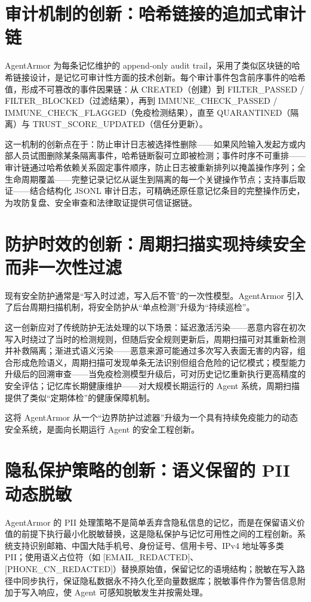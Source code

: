 \documentclass[UTF8,zihao=-4,oneside,fontset=none]{ctexrep}
\begin{document}
	\section{审计机制的创新：哈希链接的追加式审计链}
	AgentArmor 为每条记忆维护的 append-only audit trail，采用了类似区块链的哈希链接设计，是记忆可审计性方面的技术创新。每个审计事件包含前序事件的哈希值，形成不可篡改的事件因果链：从 CREATED（创建）到 FILTER\_PASSED / FILTER\_BLOCKED（过滤结果），再到 IMMUNE\_CHECK\_PASSED / IMMUNE\_CHECK\_FLAGGED（免疫检测结果），直至 QUARANTINED（隔离）与 TRUST\_SCORE\_UPDATED（信任分更新）。
	
	这一机制的创新点在于：防止审计日志被选择性删除——如果风险输入发起方或内部人员试图删除某条隔离事件，哈希链断裂可立即被检测；事件时序不可重排——审计链通过哈希依赖关系固定事件顺序，防止日志被重新排列以掩盖操作序列；全生命周期覆盖——完整记录记忆从诞生到隔离的每一个关键操作节点；支持事后取证——结合结构化 JSONL 审计日志，可精确还原任意记忆条目的完整操作历史，为攻防复盘、安全审查和法律取证提供可信证据链。
	
	\section{防护时效的创新：周期扫描实现持续安全而非一次性过滤}
	现有安全防护通常是“写入时过滤，写入后不管”的一次性模型。AgentArmor 引入了后台周期扫描机制，将安全防护从“单点检测”升级为“持续巡检”。
	
	这一创新应对了传统防护无法处理的以下场景：延迟激活污染——恶意内容在初次写入时绕过了当时的检测规则，但随后安全规则更新后，周期扫描可对其重新检测并补救隔离；渐进式语义污染——恶意来源可能通过多次写入表面无害的内容，组合形成危险语义，周期扫描可发现单条无法识别但组合危险的记忆模式；模型能力升级后的回溯审查——当免疫检测模型升级后，可对历史记忆重新执行更高精度的安全评估；记忆库长期健康维护——对大规模长期运行的 Agent 系统，周期扫描提供了类似“定期体检”的健康保障机制。
	
	这将 AgentArmor 从一个“边界防护过滤器”升级为一个具有持续免疫能力的动态安全系统，是面向长期运行 Agent 的安全工程创新。
	
	\section{隐私保护策略的创新：语义保留的 PII 动态脱敏}
	AgentArmor 的 PII 处理策略不是简单丢弃含隐私信息的记忆，而是在保留语义价值的前提下执行最小化脱敏替换，这是隐私保护与记忆可用性之间的工程创新。系统支持识别邮箱、中国大陆手机号、身份证号、信用卡号、IPv4 地址等多类 PII；使用语义占位符（如 [EMAIL\_REDACTED]、[PHONE\_CN\_REDACTED]）替换原始值，保留记忆的语境结构；脱敏在写入路径中同步执行，保证隐私数据永不持久化至向量数据库；脱敏事件作为警告信息附加于写入响应，使 Agent 可感知脱敏发生并按需处理。
	
\end{document}
